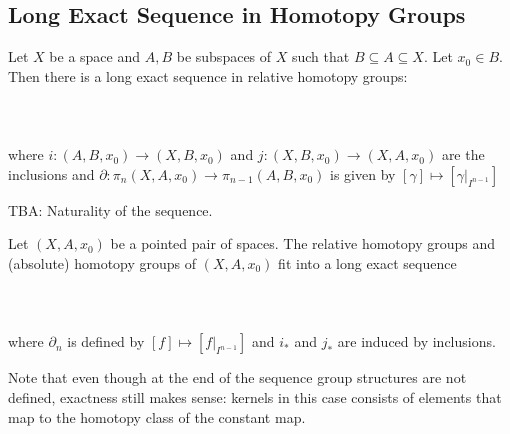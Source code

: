 \documentclass[a4paper]{article}
\begin{document}
\subsection{Long Exact Sequence in Homotopy Groups}
\begin{thm}{}{} Let $X$ be a space and $A,B$ be subspaces of $X$ such that $B\subseteq A\subseteq X$. Let $x_0\in B$. Then there is a long exact sequence in relative homotopy groups: \\~\\
\\~\\
where $i:(A,B,x_0)\to(X,B,x_0)$ and $j:(X,B,x_0)\to(X,A,x_0)$ are the inclusions and $\partial:\pi_n(X,A,x_0)\to\pi_{n-1}(A,B,x_0)$ is given by $[\gamma]\mapsto[\gamma|_{I^{n-1}}]$
\end{thm}

TBA: Naturality of the sequence. 

\begin{thm}{}{} Let $(X,A,x_0)$ be a pointed pair of spaces. The relative homotopy groups and (absolute) homotopy groups of $(X,A,x_0)$ fit into a long exact sequence \\~\\
\\~\\
where $\partial_n$ is defined by $[f]\mapsto [f|_{I^{n-1}}]$ and $i_\ast$ and $j_\ast$ are induced by inclusions. 
\end{thm}

Note that even though at the end of the sequence group structures are not defined, exactness still makes sense: kernels in this case consists of elements that map to the homotopy class of the constant map. 
\end{document}
